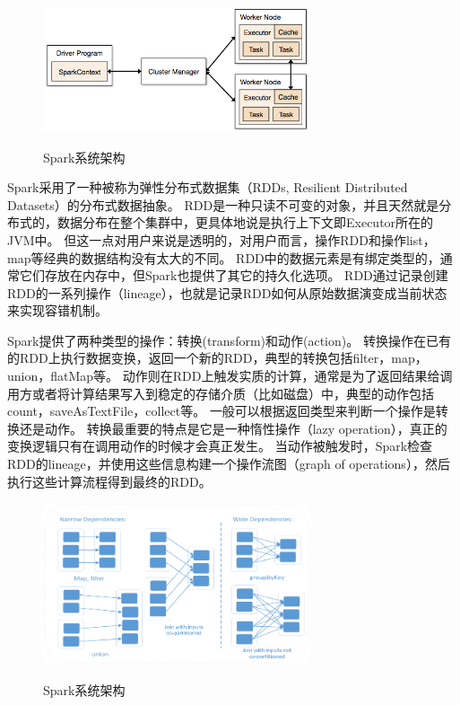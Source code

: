 \documentclass[master]{njuthesis}
\begin{document}
\begin{figure}[h]
  \centering
  \includegraphics[width= 0.7\textwidth]{figure/spark_components.png}\\
  \caption{Spark系统架构}
  \label{fig:spark_components}
\end{figure}
Spark采用了一种被称为弹性分布式数据集\cite{DBLP:conf/nsdi/ZahariaCDDMMFSS12}（RDDs, Resilient Distributed Datasets）的分布式数据抽象。
RDD是一种只读不可变的对象，并且天然就是分布式的，数据分布在整个集群中，更具体地说是执行上下文即Executor所在的JVM中。
但这一点对用户来说是透明的，对用户而言，操作RDD和操作list，map等经典的数据结构没有太大的不同。
RDD中的数据元素是有绑定类型的，通常它们存放在内存中，但Spark也提供了其它的持久化选项。
RDD通过记录创建RDD的一系列操作（lineage），也就是记录RDD如何从原始数据演变成当前状态来实现容错机制。

Spark提供了两种类型的操作：转换(transform)和动作(action)。 
转换操作在已有的RDD上执行数据变换，返回一个新的RDD，典型的转换包括filter，map，union，flatMap等。
动作则在RDD上触发实质的计算，通常是为了返回结果给调用方或者将计算结果写入到稳定的存储介质（比如磁盘）中，典型的动作包括count，saveAsTextFile，collect等。
一般可以根据返回类型来判断一个操作是转换还是动作。
转换最重要的特点是它是一种惰性操作（lazy operation），真正的变换逻辑只有在调用动作的时候才会真正发生。
当动作被触发时，Spark检查RDD的lineage，并使用这些信息构建一个操作流图（graph of operations），然后执行这些计算流程得到最终的RDD。

\iffalse
\begin{figure}[htbp]
  \centering
  \includegraphics[width= 0.7\textwidth]{figure/rdd_dependency.png}\\
  \caption{Spark系统架构}
  \label{fig:rdd_dependency}
\end{figure}
\end{document}
